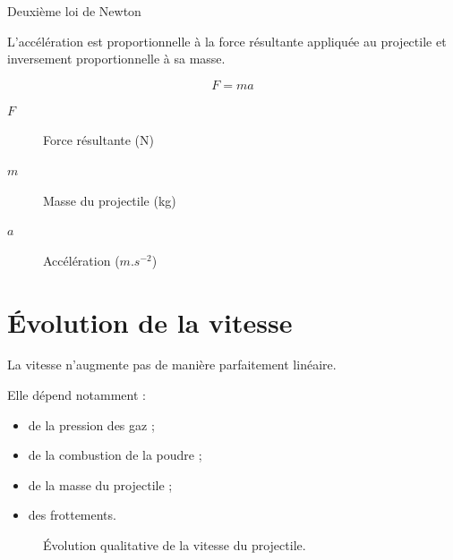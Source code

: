 \begin{formule}{Deuxième loi de Newton}

L'accélération est proportionnelle à la force résultante appliquée au
projectile et inversement proportionnelle à sa masse.

\begin{equation}
\label{newton2}
F = ma
\end{equation}

\begin{description}

\item[$F$] Force résultante (N)

\item[$m$] Masse du projectile (kg)

\item[$a$] Accélération ($m.s^{-2}$)

\end{description}

\end{formule}

\section{Évolution de la vitesse}

La vitesse n'augmente pas de manière parfaitement linéaire.

Elle dépend notamment :

\begin{itemize}
    \item de la pression des gaz ;
    \item de la combustion de la poudre ;
    \item de la masse du projectile ;
    \item des frottements.
\end{itemize}

\begin{figure}[htbp]
\centering


\caption{Évolution qualitative de la vitesse du projectile.}

\end{figure}


